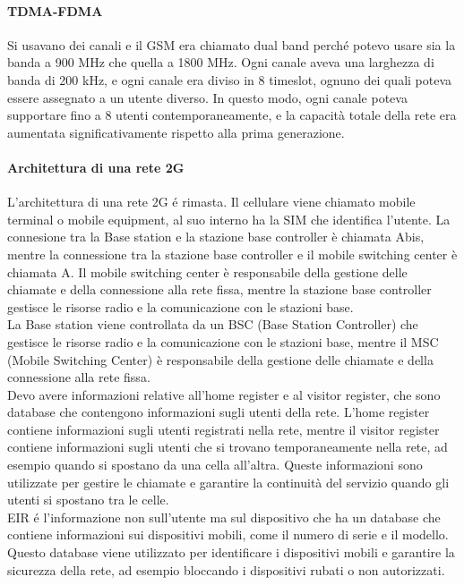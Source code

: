 \paragraph{TDMA-FDMA}
Si usavano dei canali e il GSM era chiamato dual band perché potevo usare sia la banda a 900 MHz che quella a 1800 MHz. Ogni canale aveva una larghezza di banda di 200 kHz, e ogni canale era diviso in 8 timeslot, ognuno dei quali poteva essere assegnato a un utente diverso. In questo modo, ogni canale poteva supportare fino a 8 utenti contemporaneamente, e la capacità totale della rete era aumentata significativamente rispetto alla prima generazione.\\
\paragraph{Architettura di una rete 2G}
L'architettura di una rete 2G é rimasta. Il cellulare viene chiamato mobile terminal o mobile equipment, al suo interno ha la SIM che identifica l'utente. La connesione tra la Base station e la stazione base controller è chiamata Abis, mentre la connessione tra la stazione base controller e il mobile switching center è chiamata A. Il mobile switching center è responsabile della gestione delle chiamate e della connessione alla rete fissa, mentre la stazione base controller gestisce le risorse radio e la comunicazione con le stazioni base.\\
La Base station viene controllata da un BSC (Base Station Controller) che gestisce le risorse radio e la comunicazione con le stazioni base, mentre il MSC (Mobile Switching Center) è responsabile della gestione delle chiamate e della connessione alla rete fissa.\\
Devo avere informazioni relative all'home register e al visitor register, che sono database che contengono informazioni sugli utenti della rete. L'home register contiene informazioni sugli utenti registrati nella rete, mentre il visitor register contiene informazioni sugli utenti che si trovano temporaneamente nella rete, ad esempio quando si spostano da una cella all'altra. Queste informazioni sono utilizzate per gestire le chiamate e garantire la continuità del servizio quando gli utenti si spostano tra le celle.\\
EIR é l'informazione non sull'utente ma sul dispositivo che ha un database che contiene informazioni sui dispositivi mobili, come il numero di serie e il modello. Questo database viene utilizzato per identificare i dispositivi mobili e garantire la sicurezza della rete, ad esempio bloccando i dispositivi rubati o non autorizzati.\\

